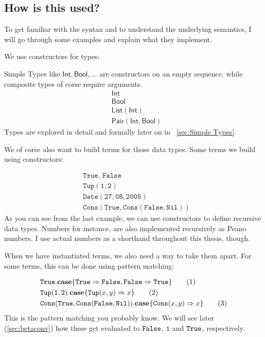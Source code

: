 \documentclass[twoside,12pt,a4paper]{article}
\begin{document}
\subsection{How is this used?}

To get familiar with the syntax and to understand the underlying semantics, 
I will go through some examples and explain what they implement.

We use constructors for types:
\begin{example}
    Simple Types like $\mathsf{Int, Bool, ...}$ are constructors on an empty sequence, 
    while composite types of corse require arguments.
    \begin{align*}
        &\mathsf{Int}\tag{1}\\
        &\mathsf{Bool}\tag{2}\\
        &\mathsf{List(Int)}\tag{3}\\
        &\mathsf{Pair(Int, Bool)}\tag{4}
    \end{align*}
    Types are explored in detail and formally later on in ~\ref{sec:Simple Types}.
\end{example}

We of corse also want to build terms for those data types. 
Some terms we build using constructors:

\begin{example}
    \begin{align*}
        &\texttt{True, False}\tag{1}\\
        &\mathtt{Tup(1,2)}\tag{2}\\
        &\mathtt{Date(27, 08, 2005)}\tag{3}\\
        &\mathtt{Cons(True, Cons(False, Nil))}\tag{4}              
    \end{align*}
    As you can see from the last example, we can use constructors to define recursive data types.
    Numbers for instance, are also implemented recursively as Peano numbers. 
    I use actual numbers as a shorthand throughout this thesis, though.
\end{example}

When we have instantiated terms, we also need a way to take them apart. 
For some terms, this can be done using pattern matching:

\begin{example}
    \begin{align*}
        &\mathtt{True}.\textbf{case}\{\mathtt{True\Rightarrow False, False\Rightarrow True}\}\tag{1}\\
        &\mathtt{Tup(1,2)}.\textbf{case}\{\mathtt{Tup(}x, y\mathtt{)}\Rightarrow x\}\tag{2}\\
        &\mathtt{Cons(True, Cons(False, Nil))}.\textbf{case}\{\mathtt{Cons(}x, y\mathtt{)}\Rightarrow x\}\tag{3}   
    \end{align*}
    This is the pattern matching you probably know. 
    We will see later (\ref{sec:betaconv}) how these get evaluated to $\mathtt{False}$, $\mathtt{1}$ and $\mathtt{True}$, respectively.
\end{example}
\end{document}
